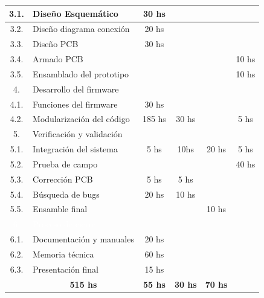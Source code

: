 \documentclass[11pt]{charter}
\begin{document}
\begin{table}[htpb]
\begin{tabularx}{\linewidth}{@{}|c|l|X|X|X|X|@{}}
 3.1. &Diseño Esquemático &\multicolumn{1}{|c|}{30 hs} &  &  &  \\ \hline
 3.2. &Diseño diagrama conexión &\multicolumn{1}{|c|}{20 hs} &  &  &  \\ \hline
 3.3. &Diseño PCB  &\multicolumn{1}{|c|}{30 hs} &  &  &  \\ \hline
 3.4. &Armado PCB  &  &  &  &\multicolumn{1}{|c|}{10 hs}  \\ \hline
 3.5. &Ensamblado del prototipo  &  &  &  &\multicolumn{1}{|c|}{10 hs} \\ \hline
 
 \rowcolor[HTML]{FFD200}
 4. &
 \multicolumn{5}{|l|}{Desarrollo del firmware}\\ \cline{1-6}
 
 4.1. &Funciones del firmware  &\multicolumn{1}{|c|}{30 hs} &  &  &  \\ \hline
 4.2. &Modularización del código &\multicolumn{1}{|c|}{185 hs} &\multicolumn{1}{|c|}{30 hs}  &  &\multicolumn{1}{|c|}{5 hs}  \\ \hline
 
 \rowcolor[HTML]{00FF00}
 5. &
 \multicolumn{5}{|l|}{Verificación y validación}\\ \cline{1-6}
 
 5.1. &Integración del sistema  &\multicolumn{1}{|c|}{5 hs} &\multicolumn{1}{|c|}{10hs}  &\multicolumn{1}{|c|}{20 hs}  &\multicolumn{1}{|c|}{5 hs} \\ \hline
 5.2. &Prueba de campo  &  &  &  &\multicolumn{1}{|c|}{40 hs}  \\ \hline
 5.3. &Corrección PCB  &\multicolumn{1}{|c|}{5 hs} &\multicolumn{1}{|c|}{5 hs} &  &  \\ \hline
 5.4. &Búsqueda de bugs  &\multicolumn{1}{|c|}{20 hs} &\multicolumn{1}{|c|}{10 hs} &  &  \\ \hline
 5.5. &Ensamble final  &  &  &\multicolumn{1}{|c|}{10 hs} &  \\ \hline
 
 \rowcolor[HTML]{800080}
 \textcolor{white}{6. } &
 \multicolumn{5}{|l|}{\textcolor{white}{Proceso de cierre }}	\\ \cline{1-6} 
 
 6.1. &Documentación y manuales  &\multicolumn{1}{|c|}{20 hs} &  &  &  \\ \hline
 6.2. &Memoria técnica  &\multicolumn{1}{|c|}{60 hs} &  &  &  \\ \hline
 6.3. &Presentación final  &\multicolumn{1}{|c|}{15 hs} &  &  &  \\ \hline    

 \rowcolor[HTML]{C0C0C0}
 \multicolumn{2}{|c|}{\textbf{Totales }} &\multicolumn{1}{|c|}{\textbf{515 hs}}	&\multicolumn{1}{|c|}{\textbf{55 hs}}	&\multicolumn{1}{|c|}{\textbf{30 hs}}	&\multicolumn{1}{|c|}{\textbf{70 hs}}	\\ \cline{1-6}

\end{tabularx}
\end{table}
\end{document}
